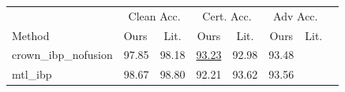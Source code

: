 \begin{tabular}{llcccccc}
\toprule
 & \multicolumn{2}{c}{Clean Acc.} & \multicolumn{2}{c}{Cert. Acc.} & \multicolumn{2}{c}{Adv Acc.} \\
Method & Ours & Lit. & Ours & Lit. & Ours & Lit. \\
\midrule
crown\_ibp\_nofusion & 97.85 & 98.18 & \underline{93.23} & 92.98 & 93.48 & \\
mtl\_ibp & 98.67 & 98.80 & 92.21 & 93.62 & 93.56 & \\
\bottomrule
\end{tabular}